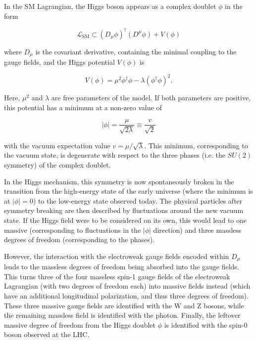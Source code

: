 In the SM Lagrangian, the Higgs boson appears as a complex doublet $\phi$ in the form

\begin{equation}
    \mathcal{L}_{\mathrm{SM}} \subset \left(D_\mu \phi\right)^\dagger \left(D^\mu \phi\right) + V(\phi)
\end{equation}

\noindent where $D_\mu$ is the covariant derivative, containing the minimal coupling to the gauge fields, and the Higgs potential $V(\phi)$ is 

\begin{equation}
    V(\phi) = \mu^2 \phi^\dagger \phi - \lambda (\phi^\dagger \phi)^2 .
\end{equation}

Here, $\mu^2$ and $\lambda$ are free parameters of the model. If both parameters are positive, this potential has a minimum at a non-zero value of

\begin{equation}
    | \phi | = \frac{\mu}{\sqrt{2 \lambda}} \equiv \frac{v}{\sqrt{2}}
\end{equation}

\noindent with the vacuum expectation value $v = \mu / \sqrt{\lambda}$. This minimum, corresponding to the vacuum state, is degenerate with respect to the three phases (i.e. the $SU(2)$ symmetry) of the complex doublet.

In the Higgs mechanism, this symmetry is now spontaneously broken in the transition from the high-energy state of the early universe (where the minimum is at $|\phi| = 0$) to the low-energy state observed today. The physical particles after symmetry breaking are then described by fluctuations around the new vacuum state. If the Higgs field were to be considered on its own, this would lead to one massive (corresponding to fluctuations in the $|\phi|$ direction) and three massless degrees of freedom (corresponding to the phases).

However, the interaction with the electroweak gauge fields encoded within $D_\mu$ leads to the massless degrees of freedom being absorbed into the gauge fields. This turns three of the four massless spin-1 gauge fields of the electroweak Lagrangian (with two degrees of freedom each) into massive fields instead (which have an additional longitudinal polarization, and thus three degrees of freedom). These three massive gauge fields are identified with the W and Z bosons, while the remaining massless field is identified with the photon. Finally, the leftover massive degree of freedom from the Higgs doublet $\phi$ is identified with the spin-0 boson observed at the LHC.

